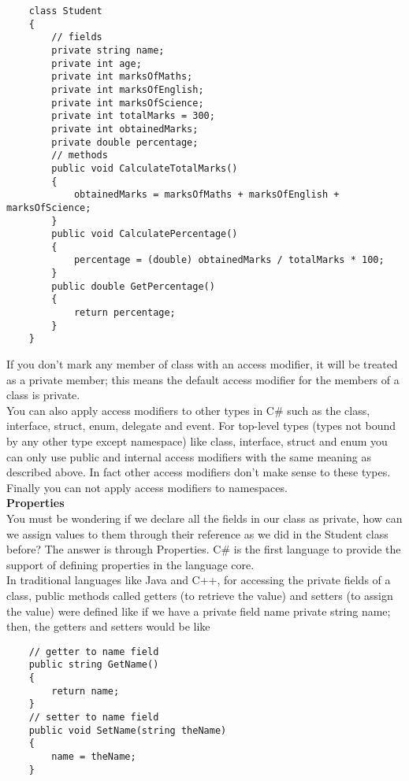 \begin{lstlisting}
    class Student
    {
        // fields
        private string name;
        private int age;
        private int marksOfMaths;
        private int marksOfEnglish;
        private int marksOfScience;
        private int totalMarks = 300;
        private int obtainedMarks;
        private double percentage;
        // methods
        public void CalculateTotalMarks()
        {
            obtainedMarks = marksOfMaths + marksOfEnglish + marksOfScience;
        }
        public void CalculatePercentage()
        {
            percentage = (double) obtainedMarks / totalMarks * 100;
        }
        public double GetPercentage()
        {
            return percentage;
        }
    }
\end{lstlisting}

If you don’t mark any member of class with an access modifier, it will be treated as a private member; this means
the default access modifier for the members of a class is private.\\

You can also apply access modifiers to other types in C\# such as the class, interface, struct, enum, delegate and
event. For top-level types (types not bound by any other type except namespace) like class, interface, struct and
enum you can only use public and internal access modifiers with the same meaning as described above. In fact
other access modifiers don’t make sense to these types. Finally you can not apply access modifiers to namespaces.\\

\textbf{Properties}\\

You must be wondering if we declare all the fields in our class as private, how can we assign values to them
through their reference as we did in the Student class before? The answer is through Properties. C\# is the first
language to provide the support of defining properties in the language core.\\

In traditional languages like Java and C++, for accessing the private fields of a class, public methods called getters
(to retrieve the value) and setters (to assign the value) were defined like if we have a private field name
private string name;
then, the getters and setters would be like

\begin{lstlisting}
    // getter to name field
    public string GetName()
    {
        return name;
    }
    // setter to name field
    public void SetName(string theName)
    {
        name = theName;
    }    
\end{lstlisting}

